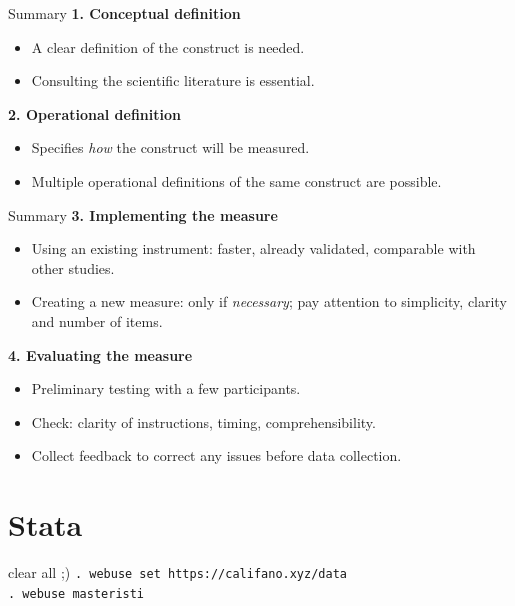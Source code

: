 \documentclass{beamer}
\begin{document}
\begin{frame}{Summary}
    \textbf{1. Conceptual definition}
    \begin{itemize}
        \item A clear definition of the construct is needed.
        \item Consulting the scientific literature is essential.
    \end{itemize}
    \vspace{0.5em}
    \textbf{2. Operational definition}
    \begin{itemize}
        \item Specifies \emph{how} the construct will be measured.
        \item Multiple operational definitions of the same construct are possible.
    \end{itemize}
\end{frame}

\begin{frame}{Summary}
    \textbf{3. Implementing the measure}
    \begin{itemize}
        \item Using an existing instrument: faster, already validated, comparable with other studies.
        \item Creating a new measure: only if \emph{necessary}; pay attention to simplicity, clarity and number of items.
    \end{itemize}
    \vspace{0.5em}
    \textbf{4. Evaluating the measure}
    \begin{itemize}
        \item Preliminary testing with a few participants.
        \item Check: clarity of instructions, timing, comprehensibility.
        \item Collect feedback to correct any issues before data collection.
    \end{itemize}
\end{frame}

\section{Stata}
\begin{frame}{clear all ;)}
    \texttt{. webuse set https://califano.xyz/data} \\
    \texttt{. webuse masteristi}
\end{frame}
\end{document}
